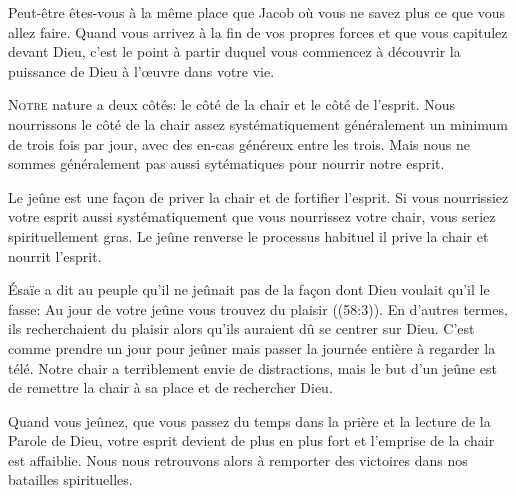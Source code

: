 Peut-être êtes-vous à la même place que Jacob où vous ne savez plus
 ce que vous allez faire. Quand vous arrivez à la fin de vos propres forces
 et que vous capitulez devant Dieu, c'est le point à partir duquel
 vous commencez à découvrir la puissance de Dieu à l'\oe{}uvre dans votre vie. 

\dvrule







\lettrine{N}{otre} nature a deux côtés:
 le côté de la chair et le côté de l'esprit.
 Nous nourrissons le côté de la chair assez systématiquement
 \ocadr généralement un minimum de trois fois par jour,
 avec des en-cas généreux entre les trois.
 Mais nous ne sommes généralement pas aussi sytématiques
 pour nourrir notre esprit. 

Le jeûne est une fa\c{c}on de priver la chair et de fortifier l'esprit.
 Si vous nourrissiez votre esprit aussi systématiquement
 que vous nourrissez votre chair, vous seriez spirituellement gras.
 Le jeûne renverse le processus habituel
 \ocadr il prive la chair et nourrit l'esprit. 


Ésaïe a dit au peuple qu'il ne jeûnait pas de la fa\c{c}on dont Dieu
 voulait qu'il le fasse:
 \Og Au jour de votre jeûne vous trouvez du plaisir \Fg{}
 ((58:3)). En d'autres termes, ils recherchaient du plaisir
 alors qu'ils auraient dû se centrer sur Dieu. C'est comme prendre
 un jour pour jeûner mais passer la journée entière à regarder la télé.
 Notre chair a terriblement envie de distractions, mais le but d'un jeûne
 est de remettre la chair à sa place et de rechercher Dieu. 

Quand vous jeûnez, que vous passez du temps dans la prière
 et la lecture de la Parole de Dieu, votre esprit devient de plus en plus
 fort et l'emprise de la chair est affaiblie. Nous nous retrouvons alors
 à remporter des victoires dans nos batailles spirituelles. 

